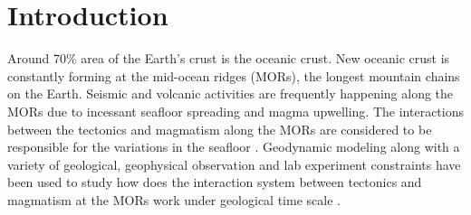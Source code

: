 \pagebreak
\section{Introduction}
\label{ch:Intro}  %

Around 70\% area of the Earth's crust is the oceanic crust. New oceanic crust is constantly forming at the mid-ocean ridges (MORs), the longest mountain chains on the Earth. Seismic and volcanic activities are frequently happening along the MORs due to incessant seafloor spreading and magma upwelling. The interactions between the tectonics and magmatism along the MORs are considered to be responsible for the variations in the seafloor .
%
%
Geodynamic modeling along with a variety of geological, geophysical observation and lab experiment constraints have been used to study how does the interaction system between tectonics and magmatism at the MORs work under geological time scale .

